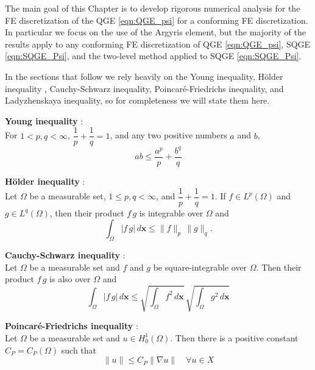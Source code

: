 The main goal of this Chapter is to develop rigorous numerical analysis for
the FE discretization of the QGE \eqref{eqn:QGE_psi} for a conforming FE
discretization. In particular we focus on the use of the Argyris element, but
the majority of the results apply to any conforming FE discretization of QGE
\eqref{eqn:QGE_psi}, SQGE \eqref{eqn:SQGE_Psi}, and the two-level method applied
to SQGE \eqref{eqn:SQGE_Psi}.

In the sections that follow we rely heavily on the Young inequality, H\"older
inequality , Cauchy-Schwarz inequality, Poincar\'e-Friedrichs inequality, and
Ladyzhenskaya inequality, so for completeness we will state them here.

\begin{definition} \label{def:Young}
  \textbf{Young inequality} \cite{Royden2010}:\\
  For $1 < p,q < \infty$, $\dfrac{1}{p} + \dfrac{1}{q} = 1$, and any two
  positive numbers $a$ and $b$,
  \begin{equation}
    ab \le \frac{a^p}{p} + \frac{b^q}{q}
    \label{eqn:Young}
  \end{equation}
\end{definition}
\begin{definition} \label{def:Holder}
  \textbf{H\"older inequality} \cite{Royden2010}:\\
  Let $\Omega$ be a measurable set, $1\le p,q < \infty$, and $\dfrac{1}{p} +
  \dfrac{1}{q} = 1$. If $f \in L^p(\Omega)$ and $g \in L^q(\Omega)$, then their
  product $f\, g$ is integrable over $\Omega$ and
  \begin{equation}
    \int_{\Omega}\! |f\, g| \, d\mathbf{x} \le \|f\|_p\, \|g\|_q.
    \label{eqn:Holder}
  \end{equation}
\end{definition}
\begin{definition} \label{def:Cauchy-Schwarz}
  \textbf{Cauchy-Schwarz inequality} \cite{Royden2010}:\\
  Let $\Omega$ be a measurable set and $f$ and $g$ be square-integrable over
  $\Omega$. Then their product $f\, g$ is also over $\Omega$ and
  \begin{equation}
    \int_{\Omega}\! |f\,g|\, d\mathbf{x} \le \sqrt{\int_{\Omega}\! f^2 \,
      d\mathbf{x}}\, \sqrt{\int_{\Omega}\! g^2 \, d\mathbf{x}}
    \label{eqn:Cauchy}
  \end{equation}

\end{definition}
\begin{definition} \label{def:Poincare}
  \textbf{Poincar\'e-Friedrichs inequality} \cite{Layton08}:\\
  Let $\Omega$ be a measurable set and $u \in H^1_0(\Omega)$. Then there is a
  positive constant $C_P = C_P(\Omega)$ such that
  \begin{equation}
    \|u\| \le C_P \|\nabla u\| \quad \forall u \in X
    \label{eqn:Poincare}
  \end{equation}
\end{definition}
